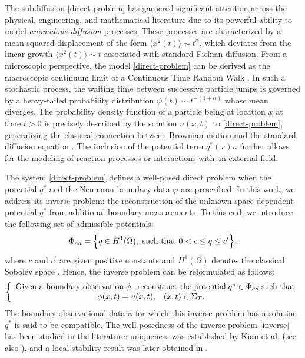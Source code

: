 \documentclass[a4paper,12pt,reqno,natbib]{amsart}
\begin{document}
The subdiffusion \eqref{direct-problem} has garnered significant attention across the physical, engineering, and mathematical literature due to its powerful ability to model \emph{anomalous diffusion} processes. These processes are characterized by a mean squared displacement of the form $\langle x^2(t) \rangle \sim t^{\alpha}$, which deviates from the linear growth $\langle x^2(t) \rangle \sim t$ associated with standard Fickian diffusion.
From a microscopic perspective, the model \eqref{direct-problem} can be derived as the macroscopic continuum limit of a Continuous Time Random Walk \cite{metzler2000random}. In such a stochastic process, the waiting time between successive particle jumps is governed by a heavy-tailed probability distribution $\psi(t) \sim t^{-(1+\alpha)}$ whose mean diverges. The probability density function of a particle being at location $x$ at time $t > 0$ is precisely described by the solution $u(x, t)$ to \eqref{direct-problem}, generalizing the classical connection between Brownian motion and the standard diffusion equation \cite{kian2021well}. The inclusion of the potential term $q^*(x)u$ further allows for the modeling of reaction processes or interactions with an external field.


\vspace{0.5cm}



The system \eqref{direct-problem} defines a well-posed direct problem when the potential $q^*$ and the Neumann boundary data $\varphi$ are prescribed. In this work, we address its inverse problem: the reconstruction of the unknown space-dependent potential $q^*$ from additional boundary measurements. To this end, we introduce the following set of admissible potentials:
\begin{align*}
    \Phi_{ad}=\Big\{ q\in H^1(\Omega), \hbox{ such that } 0< c \leq q \leq c^{\prime}\Big\},
\end{align*}
where $c$ and $c^{\prime}$ are given positive constants and $H^1(\Omega)$ denotes the classical Sobolev space \cite{brezis2010functional}. Hence, the inverse problem can be reformulated as follows: 
\begin{equation}\label{inverse}
    \left\{
  \begin{array}{lll}
    \hbox{Given a boundary observation}\; \phi,\hbox{ reconstruct the potential}\; q^*\in\Phi_{ad}\; \hbox{such that} \\

        \qquad\qquad\qquad\qquad\qquad \phi(x,t)= u(x,t),\;\;\;(x,t)\in\Sigma_T.
  \end{array}
\right.
\end{equation}
The boundary observational data $\phi$ for which this inverse problem has a solution $q^*$ is said to be compatible. The well-posedness of the inverse problem \eqref{inverse} has been studied in the literature: uniqueness was established by Kian et al. \cite{Kain2021MA} (see also \cite{rundell2018recovery}), and a local stability result was later obtained in \cite{kahlaoui2025stability}.
\end{document}
